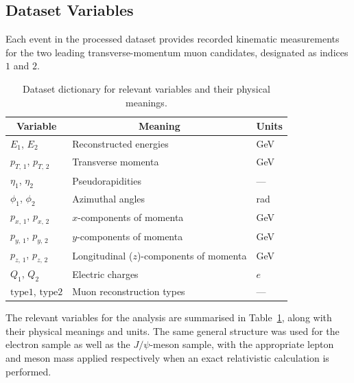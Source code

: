 \documentclass[11pt, a4paper]{article}
\numberwithin{equation}{section}
\begin{document}
\subsection{Dataset Variables}
Each event in the processed dataset provides recorded kinematic measurements for the two leading transverse-momentum muon candidates, designated as indices $1$ and $2$. 

\begin{table}[htbp]
    \begin{center}
    \begin{threeparttable}
        \caption{Dataset dictionary for relevant variables and their physical meanings.}
        \label{tab:dataset_dictionary}   
            \begin{tabular}{ | l | l | l | }
                \hline
                \multicolumn{1}{|c|}{\textbf{Variable}} & \multicolumn{1}{|c|}{\textbf{Meaning}} & \multicolumn{1}{|c|}{\textbf{Units}} \\ \hline
                $E_1$, $E_2$ & Reconstructed energies & GeV \\
                $p_{T,\,1}$, $p_{T,\,2}$ & Transverse momenta & GeV \\
                $\eta_1$, $\eta_2$ & Pseudorapidities & --- \\
                $\phi_1$, $\phi_2$ & Azimuthal angles & rad \\
                $p_{x,\,1}$, $p_{x,\,2}$ & $x$-components of momenta & GeV \\
                $p_{y,\,1}$, $p_{y,\,2}$ & $y$-components of momenta & GeV \\
                $p_{z,\,1}$, $p_{z,\,2}$ & Longitudinal ($z$)-components of momenta & GeV \\
                $Q_1$, $Q_2$ & Electric charges & $e$ \\
                $\text{type1}$, $\text{type2}$ & Muon reconstruction types & --- \\
                \hline
        \end{tabular}
    \end{threeparttable}
    \end{center}
\end{table}

The relevant variables for the analysis are summarised in Table~\ref{tab:dataset_dictionary}, along with their physical meanings and units. The same general structure was used for the electron sample as well as the $J/\psi$-meson sample, with the appropriate lepton and meson mass applied respectively when an exact relativistic calculation is performed.
\end{document}
